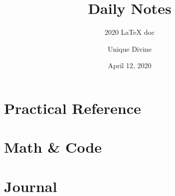 \documentclass[11pt, fancy, bibstyle=apalike, cite=authoryear]{elegantbook}
\title{Daily Notes}
\subtitle{2020 \LaTeX{} doc}
\author{Unique Divine}
\institute{Elegant\LaTeX{} Program}
\date{April 12, 2020}
\begin{document}
\maketitle
\frontmatter
\tableofcontents



\mainmatter



\part{Practical Reference}



\part{Math \& Code}









\part{Journal}




\end{document}
